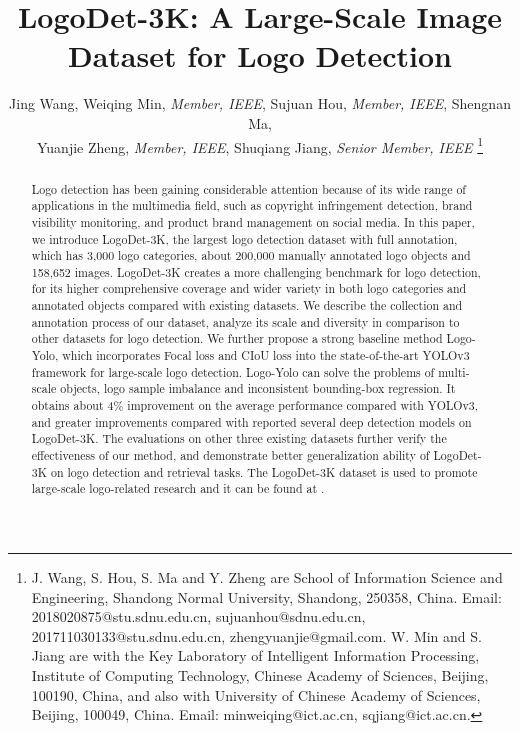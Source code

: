 \documentclass[journal]{IEEEtran}
\begin{document}
\title{LogoDet-3K: A Large-Scale Image Dataset for Logo Detection}

\author{Jing Wang, Weiqing Min, \textit{Member, IEEE}, Sujuan Hou, \textit{Member, IEEE}, Shengnan Ma, \\ Yuanjie Zheng, \textit{Member, IEEE}, Shuqiang Jiang, \textit{Senior Member, IEEE}
\thanks{J. Wang, S. Hou, S. Ma and Y. Zheng are School of Information Science and Engineering, Shandong Normal University, Shandong, 250358, China. Email: 2018020875@stu.sdnu.edu.cn, sujuanhou@sdnu.edu.cn, 201711030133@stu.sdnu.edu.cn,
zhengyuanjie@gmail.com. W. Min and S. Jiang are with the Key Laboratory of Intelligent Information Processing, Institute of Computing Technology, Chinese Academy of Sciences, Beijing, 100190, China, and also with University of Chinese Academy of Sciences, Beijing, 100049, China. Email: minweiqing@ict.ac.cn, sqjiang@ict.ac.cn.}
}




\maketitle

\begin{abstract}
Logo detection has been gaining considerable attention because of its wide range of applications in the multimedia field, such as copyright infringement detection, brand visibility monitoring, and product brand management on social media. In this paper, we introduce LogoDet-3K, the largest logo detection dataset with full annotation, which has 3,000 logo categories, about 200,000 manually annotated logo objects and 158,652 images. LogoDet-3K creates a more challenging benchmark for logo detection, for its higher comprehensive coverage and wider variety in both logo categories and annotated objects compared with existing datasets. We describe the collection and annotation process of our dataset, analyze its scale and diversity in comparison to other datasets for logo detection. We further propose a strong baseline method Logo-Yolo, which incorporates Focal loss and CIoU loss into the state-of-the-art YOLOv3 framework for large-scale logo detection. Logo-Yolo can solve the problems of multi-scale objects, logo sample imbalance and inconsistent bounding-box regression. It obtains about 4\% improvement on the average performance compared with YOLOv3, and greater improvements compared with reported several deep detection models on LogoDet-3K. The evaluations on other three existing datasets further verify the effectiveness of our method, and demonstrate better generalization ability of LogoDet-3K on logo detection and retrieval tasks. The LogoDet-3K dataset is used to promote large-scale logo-related research and it can be found at {}.

\end{abstract}
\end{document}
